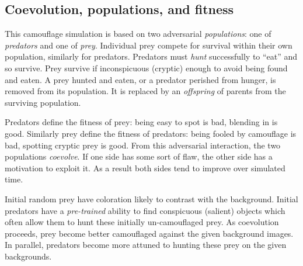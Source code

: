 \documentclass[acmtog]{acmart}
\newcommand{\jargon}[1]{\textit{#1}}
\begin{document}
\subsection{Coevolution, populations, and fitness}
This camouflage simulation is based on two adversarial \jargon{populations}: one of \jargon{predators} and one of \jargon{prey}. Individual prey compete for survival within their own population, similarly for predators. Predators must \jargon{hunt} successfully to “eat” and so survive. Prey survive if inconspicuous (cryptic) enough to avoid being found and eaten. A prey hunted and eaten, or a predator perished from hunger, is removed from its population. It is replaced by an \jargon{offspring} of parents from the surviving population.
\par
Predators define the fitness of prey: being easy to spot is bad, blending in is good. Similarly prey define the fitness of predators: being fooled by camouflage is bad, spotting cryptic prey is good. From this adversarial interaction, the two populations \jargon{coevolve}. If one side has some sort of flaw, the other side has a motivation to exploit it. As a result both sides tend to improve over simulated time.
\par
Initial random prey have coloration likely to contrast with the background. Initial predators have a \jargon{pre-trained} ability to find conspicuous (salient) objects which often allow them to hunt these initially un-camouflaged prey. As coevolution proceeds, prey become better camouflaged against the given background images. In parallel, predators become more attuned to hunting these prey on the given backgrounds.
\par

\end{document}
